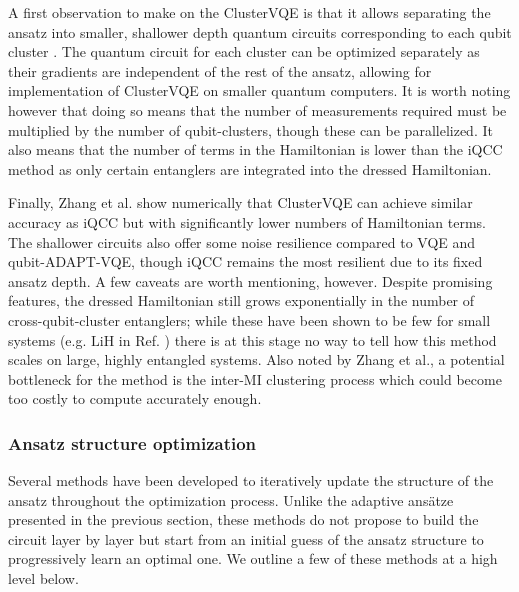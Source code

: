A first observation to make on the ClusterVQE is that it allows separating the ansatz into smaller, shallower depth quantum circuits corresponding to each qubit cluster \cite{Zhang2021}. The quantum circuit for each cluster can be optimized separately as their gradients are independent of the rest of the ansatz, allowing for implementation of ClusterVQE on smaller quantum computers. It is worth noting however that doing so means that the number of measurements required must be multiplied by the number of qubit-clusters, though these can be parallelized. It also means that the number of terms in the Hamiltonian is lower than the iQCC method as only certain entanglers are integrated into the dressed Hamiltonian.

Finally, Zhang et al. \cite{Zhang2021} show numerically that ClusterVQE can achieve similar accuracy as iQCC but with significantly lower numbers of Hamiltonian terms. The shallower circuits also offer some noise resilience compared to VQE and qubit-ADAPT-VQE, though iQCC remains the most resilient due to its fixed ansatz depth.
A few caveats are worth mentioning, however. Despite promising features, the dressed Hamiltonian still grows exponentially in the number of cross-qubit-cluster entanglers; while these have been shown to be few for small systems (e.g. $\mathrm{LiH}$ in Ref. \cite{Zhang2021}) there is at this stage no way to tell how this method scales on large, highly entangled systems. Also noted by Zhang et al., a potential bottleneck for the method is the inter-MI clustering process which could become too costly to compute accurately enough.

\subsubsection{Ansatz structure optimization} \label{sec:gate_structure_optimization}

Several methods have been developed to iteratively update the structure of the ansatz throughout the optimization process. Unlike the adaptive ans\"atze presented in the previous section, these methods do not propose to build the circuit layer by layer but start from an initial guess of the ansatz structure to progressively learn an optimal one. We outline a few of these methods at a high level below. 

